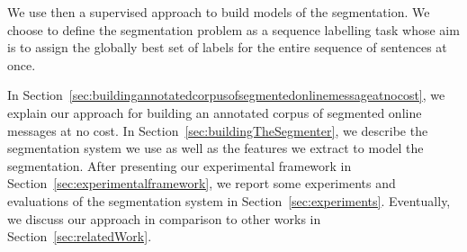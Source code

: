 
%

We use then a supervised approach to build models of the segmentation. 
We choose to define the segmentation problem as a sequence labelling task whose aim is to assign the globally best set of labels for the entire sequence of sentences at once.


In Section~\ref{sec:buildingannotatedcorpusofsegmentedonlinemessageatnocost}, we explain our approach for building an annotated corpus of segmented online messages at no cost. 
In Section~\ref{sec:buildingTheSegmenter}, we describe the segmentation system we use as well as the features we extract to model the segmentation. 
After presenting our experimental framework in Section~\ref{sec:experimentalframework}, we report some experiments and evaluations of the segmentation system in Section~\ref{sec:experiments}. 
Eventually, we discuss our approach in comparison to other works in Section~\ref{sec:relatedWork}.



